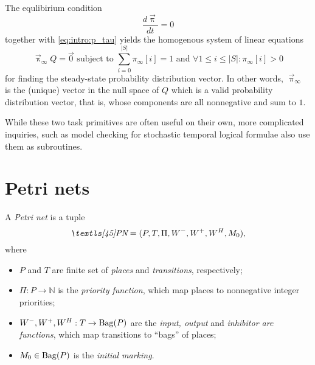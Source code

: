The equlibirium condition
\begin{equation}
  \frac{d \vec{\uppi}}{dt} = 0
\end{equation}
together with \eqref{eq:intro:p_tau} yields the homogenous system of
linear equations
\begin{equation}
  \vec{\uppi}_\infty Q = \vec{0} \text{ subject to } \sum_{i =
    0}^{\lvert S \rvert} \pi_\infty[i] = 1 \text{ and } \forall 1 \le
  i \le \lvert S \rvert :  \pi_\infty[i] > 0 \label{eq:intro:steadystate}
\end{equation}
for finding the steady-state probability distribution vector. In other
words, $\vec{\uppi}_\infty$ is the (unique) vector in the null space
of $Q$ which is a valid probability distribution vector, that is,
whose components are all nonnegative and sum to $1$.

While these two task primitives are often useful on their own, more
complicated inquiries, such as model checking for stochastic temporal
logical formulae also use them as subroutines.

\section{Petri nets}

\begin{dfn}
  A \emph{Petri net} is a tuple
  \begin{equation}
    \PN = (P, T, \Pi, W^{-}, W^{+}, W^{H}, M_0) \text,
  \end{equation}
  where
  \begin{itemize}
  \item $P$ and $T$ are finite set of \emph{places} and
    \emph{transitions}, respectively;
  \item $\Pi: P \to \mathbb{N}$ is the \emph{priority function}, which
    map places to nonnegative integer priorities;
  \item $W^{-}, W^{+}, W^{H} : T \to \operatorname{Bag}(P)$ are the \emph{input,
      output} and \emph{inhibitor arc functions}, which map
    transitions to ``bags''  of places;
  \item $M_0 \in \operatorname{Bag}(P)$ is the \emph{initial marking}.
  \end{itemize}
\end{dfn}

